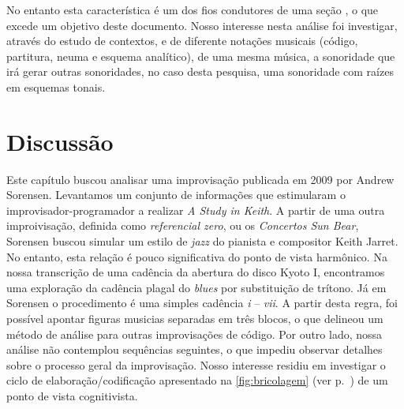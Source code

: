 No entanto esta característica é um dos fios condutores de uma seção , o que excede um objetivo deste documento. Nosso interesse nesta análise foi investigar, através do estudo de contextos, e de diferente notações musicais (código, partitura, neuma e esquema analítico), de uma mesma música, a sonoridade que irá gerar outras sonoridades, no caso desta pesquisa, uma sonoridade com raízes em esquemas tonais.

\section{Discussão}

Este capítulo buscou analisar uma improvisação publicada em 2009 por Andrew Sorensen. Levantamos um conjunto de informações que estimularam o improvisador-programador a realizar \emph{A Study in Keith}. A partir de uma outra improivisação,  definida como \emph{referencial zero}, ou os \emph{Concertos Sun Bear}, Sorensen buscou simular um estilo de \emph{jazz} do pianista e compositor Keith Jarret. No entanto, esta relação é pouco significativa do ponto de vista harmônico. Na nossa transcrição de uma cadência da abertura do disco Kyoto I, encontramos uma exploração da cadência plagal do \emph{blues} por substituição de trítono. Já em Sorensen o procedimento é uma simples cadência \emph{i} -- \emph{vii}. A partir desta regra, foi possível apontar figuras musicias separadas em três blocos, o que delineou um método de análise para outras improvisações de código. Por outro lado, nossa análise não contemplou sequências seguintes, o que impediu observar detalhes sobre o processo geral da improvisação. Nosso interesse residiu em investigar o ciclo de elaboração/codificação apresentado na \autoref{fig:bricolagem} (ver p.~\pageref{fig:bricolagem}) de um ponto de vista cognitivista. 
